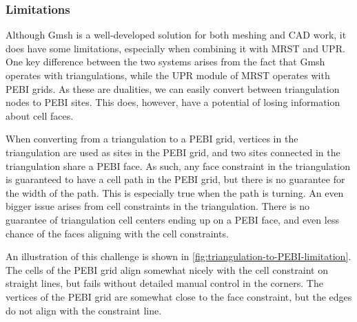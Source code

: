 \subsubsection{Limitations}
\label{sec:Gmsh-limitations}
Although Gmsh is a well-developed solution for both meshing and CAD work, it does have some limitations, especially when combining it with MRST and UPR. One key difference between the two systems arises from the fact that Gmsh operates with triangulations, while the UPR module of MRST operates with PEBI grids. As these are dualities, we can easily convert between triangulation nodes to PEBI sites. This does, however, have a potential of losing information about cell faces.

When converting from a triangulation to a PEBI grid, vertices in the triangulation are used as sites in the PEBI grid, and two sites connected in the triangulation share a PEBI face. As such, any face constraint in the triangulation is guaranteed to have a cell path in the PEBI grid, but there is no guarantee for the width of the path. This is especially true when the path is turning. An even bigger issue arises from cell constraints in the triangulation. There is no guarantee of triangulation cell centers ending up on a PEBI face, and even less chance of the faces aligning with the cell constraints.

An illustration of this challenge is shown in \autoref{fig:triangulation-to-PEBI-limitation}. The cells of the PEBI grid align somewhat nicely with the cell constraint on straight lines, but fails without detailed manual control in the corners. The vertices of the PEBI grid are somewhat close to the face constraint, but the edges do not align with the constraint line.

